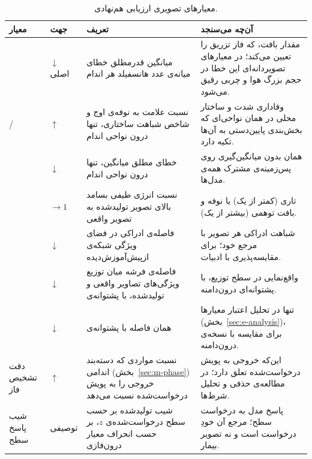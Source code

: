 \begin{table}[H]
\centering
\scriptsize
\caption{معیارهای تصویری ارزیابی هم‌نهادی. }
\label{tab:syn-metrics}
\begin{tabular}{|R{1.9cm}|R{0.9cm}|R{4.3cm}|R{5.4cm}|}
\hline
\textbf{معیار} & \textbf{جهت} & \textbf{تعریف} & \textbf{آن‌چه می‌سنجد} \\
\hline
{} & $\downarrow$ اصلی & میانگین قدرمطلق خطای میانه‌ی عدد هانسفیلد هر اندام & مقدار  بافت، که فاز تزریق را تعیین می‌کند؛ در معیارهای تصویردانه‌ای این خطا در حجم بزرگ هوا و چربی رقیق می‌شود. \\
\hline
{} /  & $\uparrow$ & نسبت علامت به نوفه‌ی اوج و شاخص شباهت ساختاری، تنها درون نواحی اندام & وفاداری شدت و ساختار محلی در همان نواحی‌ای که بخش‌بندی پایین‌دستی به آن‌ها تکیه دارد. \\
\hline
{} & $\downarrow$ & خطای مطلق میانگین، تنها درون نواحی اندام & همان  بدون میانگین‌گیری روی پس‌زمینه‌ی مشترک همه‌ی مدل‌ها. \\
\hline
{} & $\to 1$ & نسبت انرژی طیفی بسامد بالای تصویر تولیدشده به تصویر واقعی & تاری (کمتر از یک) یا نوفه و بافت توهمی (بیشتر از یک). \\
\hline
{} & $\downarrow$ & فاصله‌ی ادراکی در فضای ویژگی شبکه‌ی ازپیش‌آموزش‌دیده & شباهت ادراکی هر تصویر با مرجع خود؛ برای مقایسه‌پذیری با ادبیات. \\
\hline
{} & $\downarrow$ & فاصله‌ی فرشه میان توزیع ویژگی‌های تصاویر واقعی و تولیدشده، با پشتوانه‌ی  & واقع‌نمایی در سطح توزیع، با پشتوانه‌ای درون‌دامنه. \\
\hline
{} & $\downarrow$ & همان فاصله با پشتوانه‌ی  & تنها در تحلیل اعتبار معیارها (بخش~\ref{sec:e-analysis})، برای مقایسه با نسخه‌ی درون‌دامنه. \\
\hline
دقت تشخیص فاز & $\uparrow$ & نسبت مواردی که دسته‌بند اندامی (بخش~\ref{sec:m-phase}) خروجی را به پویش درخواست‌شده نسبت می‌دهد & این‌که خروجی به پویش درخواست‌شده تعلق دارد؛ در مطالعه‌ی حذفی و تحلیل شرط‌ها. \\
\hline
شیب پاسخ سطح & توصیفی & شیب  تولیدشده بر حسب سطح درخواست‌شده‌ی $z$، بر حسب انحراف معیار درون‌فازی & پاسخ مدل به درخواست سطح؛ مرجع آن خودِ درخواست است و نه تصویر بیمار. \\
\hline
\end{tabular}
\end{table}


